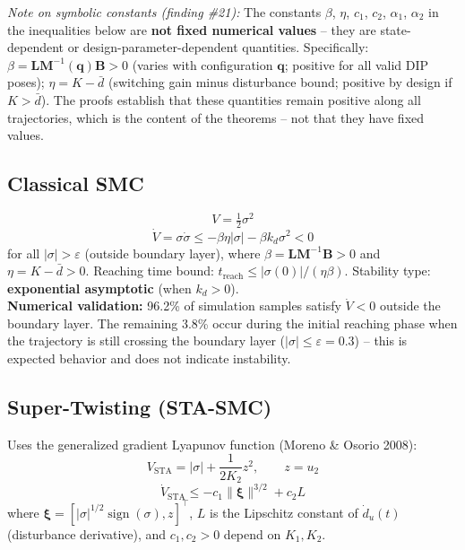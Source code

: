 \documentclass[11pt, a4paper]{article}
\newcommand{\vq}{\boldsymbol{q}}
\newcommand{\sign}{\operatorname{sign}}
\begin{document}
\textit{Note on symbolic constants (finding \#21):}
The constants $\beta$, $\eta$, $c_1$, $c_2$, $\alpha_1$, $\alpha_2$ in the
inequalities below are \textbf{not fixed numerical values} -- they are
state-dependent or design-parameter-dependent quantities.
Specifically: $\beta = \mathbf{L}\mathbf{M}^{-1}(\vq)\mathbf{B} > 0$
(varies with configuration $\vq$; positive for all valid DIP poses);
$\eta = K - \bar{d}$ (switching gain minus disturbance bound; positive
by design if $K > \bar{d}$). The proofs establish that these quantities
remain positive along all trajectories, which is the content of the
theorems -- not that they have fixed values.

\subsection{Classical SMC}

\begin{equation}
  V = \tfrac{1}{2}\sigma^2
  \label{eq:lyap_classical}
\end{equation}
\begin{equation}
  \dot{V} = \sigma\dot{\sigma}
    \leq -\beta\eta|\sigma| - \beta k_d\sigma^2 < 0
  \label{eq:lyap_classical_dot}
\end{equation}
for all $|\sigma| > \varepsilon$ (outside boundary layer),
where $\beta = \mathbf{L}\mathbf{M}^{-1}\mathbf{B} > 0$ and $\eta = K - \bar{d} > 0$.
Reaching time bound: $t_\text{reach} \leq |\sigma(0)|/(\eta\beta)$.
Stability type: \textbf{exponential asymptotic} (when $k_d > 0$).\\
\textbf{Numerical validation:} 96.2\% of simulation samples satisfy
$\dot{V} < 0$ outside the boundary layer. The remaining 3.8\% occur
during the initial reaching phase when the trajectory is still crossing
the boundary layer ($|\sigma| \leq \varepsilon = 0.3$) -- this is
expected behavior and does not indicate instability.

\subsection{Super-Twisting (STA-SMC)}

Uses the generalized gradient Lyapunov function (Moreno \& Osorio 2008):
\begin{equation}
  V_\text{STA} = |\sigma| + \frac{1}{2K_2}z^2, \qquad z = u_2
\end{equation}
\begin{equation}
  \dot{V}_\text{STA} \leq -c_1\|\bm{\xi}\|^{3/2} + c_2 L
  \label{eq:lyap_sta}
\end{equation}
where $\bm{\xi} = [|\sigma|^{1/2}\sign(\sigma), z]^\top$, $L$ is the Lipschitz
constant of $\dot{d}_u(t)$ (disturbance derivative), and $c_1, c_2 > 0$ depend
on $K_1, K_2$.
\end{document}
